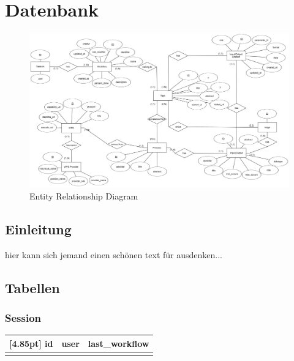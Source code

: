 \chapter{Datenbank}

    \begin{figure}[h]
        \centering
        \includegraphics[width=15cm]{diagrams/ERDiagramm.png}
        \caption{Entity Relationship Diagram}
        \label{fig:er_diagramm}
    \end{figure}
    
    
	\section{Einleitung}
	
	hier kann sich jemand einen schönen text für ausdenken...
	
	
	\section{Tabellen}
	
 		\subsection{Session}
 		\begin{center}
 			\setlength\tabcolsep{5pt}
 			\renewcommand{\arraystretch}{1.5}
 			\setcounter{ids}{0}			
 			\begin{tabular}{|c|c|c|}
 				\hline
 				\rowcolor[gray]{0.75}[4.85pt]
 				id & user & last\_workflow \\ \hline  
 				\stepcounter{ids}\arabic{ids} & & \\	
 				\hline
 			\end{tabular}
 		\end{center}		


